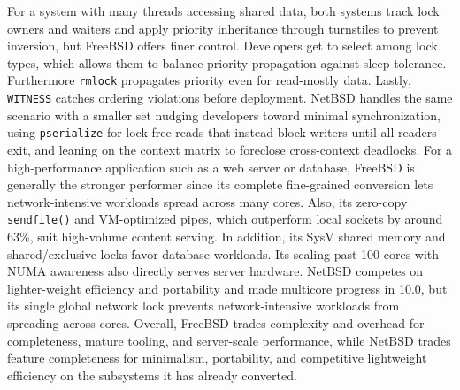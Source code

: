 For a system with many threads accessing shared data, both systems track lock owners and waiters and apply
priority inheritance through turnstiles to prevent inversion, but FreeBSD offers finer control. Developers
get to select among lock types, which allows them to balance priority propagation against sleep tolerance.
Furthermore \texttt{rmlock} propagates priority even for read-mostly data. Lastly, \texttt{WITNESS} catches ordering
violations before deployment. NetBSD handles the same scenario with a smaller set nudging developers toward minimal
synchronization, using \texttt{pserialize} for lock-free reads that instead block writers until all readers exit, and leaning on
the context matrix to foreclose cross-context deadlocks. For a high-performance application such as
a web server or database, FreeBSD is generally the stronger performer since its complete fine-grained conversion
lets network-intensive workloads spread across many cores. Also, its zero-copy \texttt{sendfile()} and VM-optimized pipes,
which outperform local sockets by around 63\%, suit high-volume content serving. In addition, its SysV shared
memory and shared/exclusive locks favor database workloads. Its scaling past 100 cores with NUMA awareness
also directly serves server hardware. NetBSD competes on lighter-weight efficiency and portability and made
multicore progress in 10.0, but its single global network lock prevents network-intensive workloads
from spreading across cores. Overall, FreeBSD trades complexity and overhead for completeness, mature tooling, and
server-scale performance, while NetBSD trades feature completeness for minimalism, portability, and
competitive lightweight efficiency on the subsystems it has already converted.
